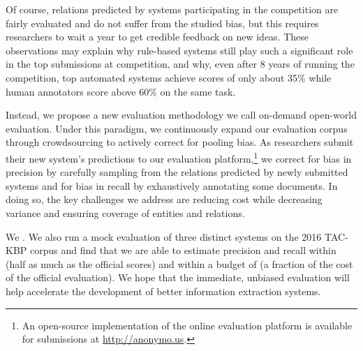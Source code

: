 Of course, relations predicted by systems participating in the competition are fairly evaluated and do not suffer from the studied bias, but this requires researchers to wait a year to get credible feedback on new ideas.
%
These observations may explain why rule-based systems still play such a significant role in the top submissions at competition, and why, even after 8 years of running the competition, top automated systems achieve scores of only about 35\% \fone{} while human annotators score above 60\% \fone{} on the same task.

Instead, we propose a new evaluation methodology we call on-demand open-world evaluation.
Under this paradigm, we continuously expand our evaluation corpus through crowdsourcing to actively correct for pooling bias.
As researchers submit their new system's predictions to our evaluation platform,\footnote{%
  An open-source implementation of the online evaluation platform is available for submissions at \url{http://anonymo.us}.
}
  we correct for bias in precision by carefully sampling from the relations predicted by newly submitted systems and
  for bias in recall by exhaustively annotating some documents.
In doing so, the key challenges we address are reducing cost while decreasing variance and ensuring coverage of entities and relations.

We .
We also run a mock evaluation of three distinct systems on the 2016 TAC-KBP corpus and find that we are able to estimate precision and recall within  \fone{} (half as much as the official scores) and within a budget of  (a fraction of the cost of the official evaluation). 
We hope that the immediate, unbiased evaluation
will help accelerate the development of better information extraction systems.



